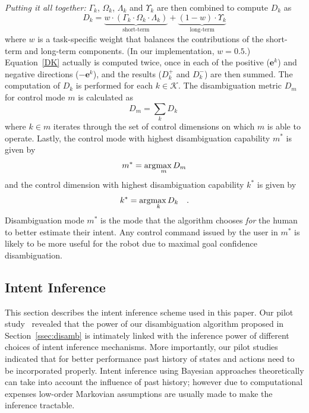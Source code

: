 \textit{Putting it all together:}
$\Gamma_k$, $\Omega_k$, $\Lambda_k$ and $\Upsilon_k$ are then combined to compute $D_{k}$ as 
\begin{equation}\label{DK}
D_{k} = \underbrace{w\cdot(\Gamma_k\cdot \Omega_k\cdot\Lambda_k)}_{\text{short-term}} + \underbrace{(1 - w)\cdot \Upsilon_k}_{\text{long-term}}
\end{equation}
where $w$ is a task-specific weight that balances the contributions of the short-term and long-term components. (In our implementation, $w=0.5$.) Equation~\ref{DK} actually is computed twice, once in each of the positive ($\boldsymbol{e}^k$) and negative directions ($-\boldsymbol{e}^k$), and the results ($D_k^+$ and $D_k^-$) are then summed. The computation of $D_k$ is performed for each $k \in \mathcal{K}$. The disambiguation metric $D_m$ for control mode $m$ is calculated as 
\begin{equation}\label{EQ2}
D_m = \sum_{k} D_{k} \;
\end{equation}
where $k \in m$ iterates through the set of control dimensions on which $m$ is able to operate.
Lastly, the control mode with highest disambiguation capability $m^*$ is given by
\begin{equation*}
m^* = \arg\!\max_m  D_{m}
\end{equation*}
and the control dimension with highest disambiguation capability $k^{*}$ is given by
\begin{equation*}
k^* = \arg\!\max_k D_k~~~.
\end{equation*}
Disambiguation mode $m^{*}$ is the mode that the algorithm chooses \textit{for} the human to better estimate their intent. Any control command issued by the user in $m^*$ is likely to be more useful for the robot due to maximal goal confidence disambiguation.
\subsection{Intent Inference}\label{ssec:inference}
This section describes the intent inference scheme used in this paper. Our pilot study~\cite{gopinath2017mode} revealed that the power of our disambiguation algorithm proposed in Section~\ref{ssec:disamb} is intimately linked with the inference power of different choices of intent inference mechanisms. More importantly, our pilot studies indicated that for better performance past history of states and actions need to be incorporated properly. Intent inference using Bayesian approaches theoretically can take into account the influence of past history; however due to computational expenses low-order Markovian assumptions are usually made to make the inference tractable. 

